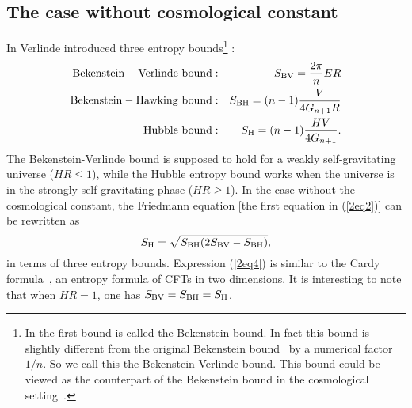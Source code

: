 \documentclass[a4paper,12pt]{article}
\begin{document}

\subsection{The case without cosmological constant}

In \cite{Verl} Verlinde introduced three entropy
bounds\footnote{In \cite{Verl} the first bound is called the
Bekenstein bound. In fact this bound is slightly different from
the original Bekenstein bound~\cite{Beke} by a numerical factor
$1/n$. So we call this the Bekenstein-Verlinde bound. This bound
could be viewed as the counterpart of the Bekenstein bound in the
cosmological setting~\cite{CMO}.} :
\begin{eqnarray}
\label{2eq3}
 {\rm Bekenstein-Verlinde\ bound}:&& S_{\rm BV}=\frac{2\pi}{n}ER
   \nonumber \\
 {\rm Bekenstein-Hawking\ bound}:&& S_{\rm BH}=(n-1)\frac{V}{4G_{n+1}R}
    \nonumber \\
  {\rm Hubble\ bound}:&& S_{\rm H}=(n-1)\frac{HV}{4G_{n+1}}.
\end{eqnarray}
The Bekenstein-Verlinde bound is supposed to hold for a weakly 
self-gravitating universe ($HR \le 1$), while the Hubble entropy bound
works when the universe is in the strongly self-gravitating 
phase ($HR \ge 1$). In the case without the cosmological constant, the Friedmann
equation [the first equation in (\ref{2eq2})] can be rewritten as
\begin{equation}
\label{2eq4} 
S_{\rm H}=\sqrt{S_{\rm BH}(2S_{\rm BV}-S_{\rm BH})},
\end{equation}
in terms of three entropy bounds. Expression (\ref{2eq4}) 
is similar to the Cardy formula~\cite{Cardy}, an
entropy formula of CFTs in two dimensions. It is interesting to
note that when $HR=1$, one has $S_{\rm BV}= S_{\rm BH}=S_{\rm H}$.
\end{document}
